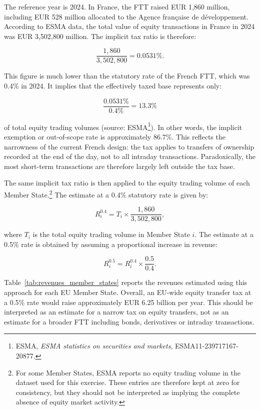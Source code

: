 \documentclass[../main]{subfiles}
\begin{document}
The reference year is 2024. In France, the FTT raised EUR 1,860 million, including EUR 528 million allocated to the Agence française de développement. According to ESMA data, the total value of equity transactions in France in 2024 was EUR 3,502,800 million. The implicit tax ratio is therefore:

\[
\frac{1,860}{3,502,800} = 0.0531\%.
\]

This figure is much lower than the statutory rate of the French FTT, which was 0.4\% in 2024. It implies that the effectively taxed base represents only:

\[
\frac{0.0531\%}{0.4\%} = 13.3\%
\]

\noindent of total equity trading volumes (source: ESMA\footnote{ESMA, \textit{ESMA statistics on securities and markets}, ESMA11-239717167-20877.}). In other words, the implicit exemption or out-of-scope rate is approximately 86.7\%. This reflects the narrowness of the current French design: the tax applies to transfers of ownership recorded at the end of the day, not to all intraday transactions. Paradoxically, the most short-term transactions are therefore largely left outside the tax base.

The same implicit tax ratio is then applied to the equity trading volume of each Member State.\footnote{For some Member States, ESMA reports no equity trading volume in the dataset used for this exercise. These entries are therefore kept at zero for consistency, but they should not be interpreted as implying the complete absence of equity market activity.} The estimate at a 0.4\% statutory rate is given by:

\[
R_i^{0.4} = T_i \times \frac{1,860}{3,502,800},
\]

\noindent where \(T_i\) is the total equity trading volume in Member State \(i\). The estimate at a 0.5\% rate is obtained by assuming a proportional increase in revenue:

\[
R_i^{0.5} = R_i^{0.4} \times \frac{0.5}{0.4}.
\]

Table~\ref{tab:revenues_member_states} reports the revenues estimated using this approach for each EU Member State. Overall, an EU-wide equity transfer tax at a 0.5\% rate would raise approximately EUR 6.25 billion per year. This should be interpreted as an estimate for a narrow tax on equity transfers, not as an estimate for a broader FTT including bonds, derivatives or intraday transactions.
\end{document}
